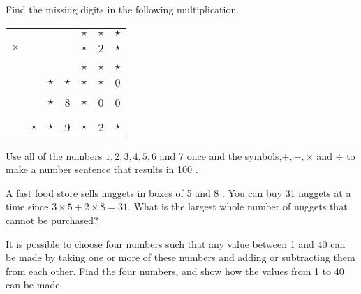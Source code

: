 \begin{challenge}
\begin{questions}
\begin{center}
        \end{center}
        \Question[3] Find the missing digits in the following multiplication.
        \par\centering
            \begin{tabular}{ccccccc}
                        & & & &$\star$&$\star$&$\star$\\
                $\times$& & & &$\star$&2&$\star$\\
                \hline\\
                        & & & &$\star$&$\star$&$\star$\\
                        & &$\star$&$\star$&$\star$&$\star$&0\\
                        & &$\star$&8&$\star$&0&0\\
                \hline\\
                        &$\star$&$\star$&9&$\star$&2&$\star$\\
                \hline
            \end{tabular}
            \begin{solutionorbox}[2in]
            \end{solutionorbox}
        \Question[3] Use all of the numbers \(1,2,3,4,5,6\) and 7 once and the symbols,\(+,-,\times\) and \(\div\) to make a number sentence that results in 100 .
            \begin{solutionorbox}[2in]
            \end{solutionorbox}
        \Question[4] A fast food store sells nuggets in boxes of 5 and 8 . You can buy 31 nuggets at a time since \(3 \times 5+2 \times 8=31\). What is the largest whole number of nuggets that cannot be purchased?
            \begin{solutionorbox}[2in]
            \end{solutionorbox}
        \Question[4] It is possible to choose four numbers such that any value between 1 and 40 can be made by taking one or more of these numbers and adding or subtracting them from each other. Find the four numbers, and show how the values from 1 to 40 can be made.
            \begin{solutionorbox}[2in]
            \end{solutionorbox}
    \end{questions}
\end{challenge}
